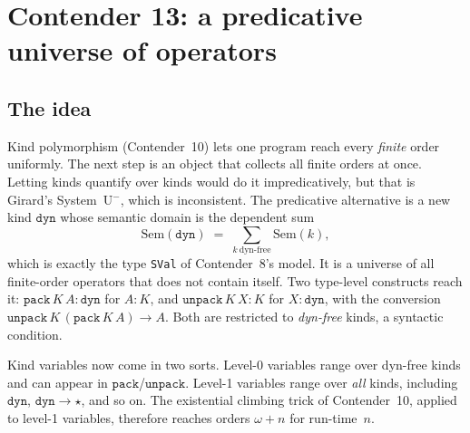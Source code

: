 \documentclass[11pt]{article}
\theoremstyle{definition}
\theoremstyle{remark}
\newcommand{\lean}[1]{\texttt{#1}}
\begin{document}
\section{Contender 13: a predicative universe of operators}

\subsection{The idea}
Kind polymorphism (Contender~10) lets one program reach every \emph{finite}
order uniformly. The next step is an object that collects all finite orders at
once. Letting kinds quantify over kinds would do it impredicatively, but that
is Girard's System~U$^-$, which is inconsistent. The predicative alternative is
a new kind $\mathtt{dyn}$ whose semantic domain is the dependent sum
\[\mathrm{Sem}(\mathtt{dyn}) \;=\; \textstyle\sum_{k\ \text{dyn-free}}\mathrm{Sem}(k),\]
which is exactly the type \lean{SVal} of Contender~8's model. It is a universe
of all finite-order operators that does not contain itself. Two type-level
constructs reach it: $\mathtt{pack}\,K\,A:\mathtt{dyn}$ for $A:K$, and
$\mathtt{unpack}\,K\,X:K$ for $X:\mathtt{dyn}$, with the conversion
$\mathtt{unpack}\,K\,(\mathtt{pack}\,K\,A)\to A$. Both are restricted to
\emph{dyn-free} kinds, a syntactic condition.

Kind variables now come in two sorts. Level-0 variables range over dyn-free
kinds and can appear in $\mathtt{pack}$/$\mathtt{unpack}$. Level-1 variables
range over \emph{all} kinds, including $\mathtt{dyn}$, $\mathtt{dyn}\to\star$,
and so on. The existential climbing trick of Contender~10, applied to level-1
variables, therefore reaches orders $\omega+n$ for run-time~$n$.
\end{document}
